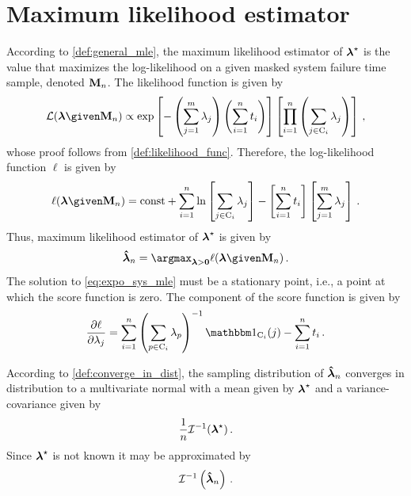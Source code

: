 \documentclass[../main.tex]{subfiles}
\begin{document}
\section{Maximum likelihood estimator}
According to \cref{def:general_mle}, the maximum likelihood estimator of ${\boldsymbol{\lambda}}^{\star}$ is the value that maximizes the log-likelihood on a given masked system failure time sample, denoted $\mathbf{M}_n$. The likelihood function is given by
\begin{equation}
\label{eq:expo_like}
\likelihood(\vec\lambda \given \mfs) \propto
    \exp \left [ - \left ( \sum_{j=1}^{m} \lambda_j \right ) \left ( \sum_{i=1}^{n} t_i \right ) \right ]
    \left [ \prod_{i=1}^{n} \left ( \sum_{j \in \cand_i} \lambda_j \right ) \right ]\,,
\end{equation}
whose proof follows from \cref{def:likelihood_func}. Therefore, the log-likelihood function $\ell$ is given by
\begin{equation}
    \ell(\vec{\lambda} \given \mfs) = \text{const} + \sum_{i=1}^{n} \ln \left [ \sum_{j \in \cand_i} \lambda_j \right ] - \left [ \sum_{i=1}^{n} t_i \right ] \left [ \sum_{j=1}^{m} \lambda_j \right ]\,.
\end{equation}
Thus, maximum likelihood estimator of ${\boldsymbol{\lambda}}^{\star}$ is given by
\begin{equation}
\label{eq:expo_sys_mle}
    \expomle = \argmax_{\vec\lambda > \vec{0}} \ell(\vec\lambda \given \mfs)\,.
\end{equation}
The solution to \cref{eq:expo_sys_mle} must be a stationary point, i.e., a point at which the score function is zero. The \jth component of the score function is given by
\begin{equation}
\label{eq:score_expo_j}
    \frac{\partial \ell}{\partial \lambda_j} = 
    \sum_{i=1}^{n} \left ( \sum_{p \in \cand_i} \lambda_p \right )^{-1} \SetIndicator{\cand_i}(j) - \sum_{i=1}^{n} t_i\,.
\end{equation}

According to \cref{def:converge_in_dist}, the sampling distribution of $\boldsymbol{\hat{\lambda}}_n$ converges in distribution to a multivariate normal with a mean given by ${\boldsymbol{\lambda}}^{\star}$ and a variance-covariance given by
\begin{equation}
    \frac{1}{n} \mathcal{I}^{-1}({\boldsymbol{\lambda}}^{\star})\,.
\end{equation}
Since ${\boldsymbol{\lambda}}^{\star}$ is not known it may be approximated by
\begin{equation}
    \mathcal{I}^{-1}\left(\boldsymbol{\hat{\lambda}}_n\right)\,.
\end{equation}
\end{document}
